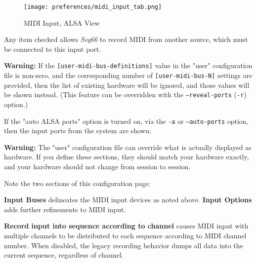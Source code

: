 
\begin{figure}[H]
   \centering 
   \texttt{[image: preferences/midi\_input\_tab.png]}
   \caption{MIDI Input, ALSA View}
   \label{fig:seq66_midi_input_tab}
\end{figure}

   Any item checked allows \textsl{Seq66} to record MIDI from another source,
   which must be connected to this input port.

   \textbf{Warning:}
   If the 
   \texttt{[user-midi-bus-definitions]} value in the "user" configuration file
   is non-zero, and the
   corresponding number of
   \texttt{[user-midi-bus-N]} settings are provided, then
   the list of existing hardware will be ignored, and those values will be
   shown instead.
   (This feature can be overridden with the
   \texttt{--reveal-ports} (\texttt{-r}) option.)

   If the "auto ALSA ports" option is turned on, via the \texttt{-a} or
   \texttt{--auto-ports} option, then
   the input ports from the system are shown.

   \textbf{Warning:}
   The "user" configuration file can override what is actually
   displayed as hardware.  If you define these sections, they should match your
   hardware exactly, and your hardware should not change from session to
   session.

   Note the two sections of this configuration page:

   \textbf{Input Buses} delineates the MIDI input devices as noted above.
   \textbf{Input Options} adds further refinements to MIDI input.

   \textbf{Record input into sequence according to channel}
   causes MIDI input with multiple channels to be distributed to
   each sequence according to MIDI channel number.
   When disabled, the legacy recording behavior dumps all data into the current
   sequence, regardless of channel.

